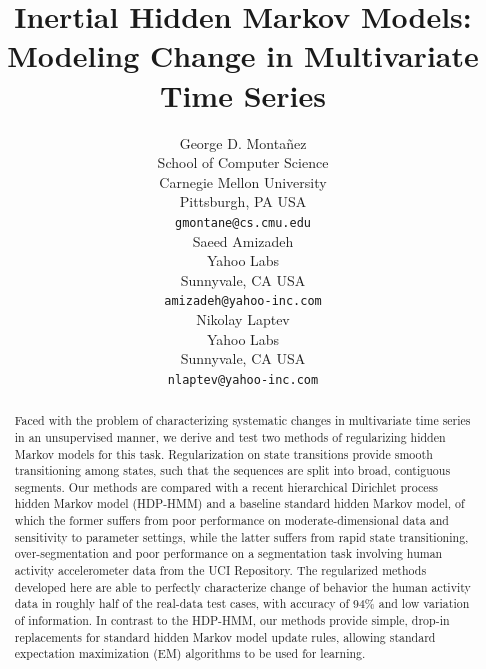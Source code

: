 \documentclass[letterpaper]{article}
\title{Inertial Hidden Markov Models: Modeling Change in Multivariate Time Series}
\author{George D. Monta\~nez \\
School of Computer Science\\
Carnegie Mellon University\\
Pittsburgh, PA USA\\
\texttt{gmontane@cs.cmu.edu} \\
\And
Saeed Amizadeh\\
Yahoo Labs\\
Sunnyvale, CA USA\\
\texttt{amizadeh@yahoo-inc.com}\\
\And
Nikolay Laptev\\
Yahoo Labs\\
Sunnyvale, CA USA\\
\texttt{nlaptev@yahoo-inc.com}}
\begin{document}
\maketitle

\begin{abstract}
    Faced with the problem of characterizing systematic changes in multivariate
    time series in an unsupervised manner, we derive and test two methods of regularizing hidden
    Markov models for this task. Regularization on state transitions provide
    smooth transitioning among states, such that the sequences are split into
    broad, contiguous segments. Our methods are compared with a recent
    hierarchical Dirichlet process hidden Markov model (HDP-HMM) and a baseline
    standard hidden Markov model, of which the former suffers from poor
    performance on moderate-dimensional data and sensitivity to parameter
    settings, while the latter suffers from rapid state transitioning,
    over-segmentation and poor performance on a segmentation task involving
    human activity accelerometer data from the UCI Repository.
    The regularized methods developed here are able to perfectly characterize
    change of behavior the human activity data in roughly half of the real-data
    test cases, with accuracy of 94\% and low variation of information. In contrast to the
    HDP-HMM, our methods provide simple, drop-in replacements for standard
    hidden Markov model update rules, allowing standard expectation maximization
    (EM) algorithms to be used for learning. 
\end{abstract}
\vspace{-0.1cm}
\end{document}
